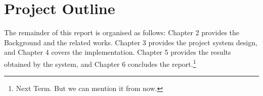\section{Project Outline}
The remainder of this report is organised as follows: Chapter 2 provides the Background and the related works. Chapter 3 provides the project system design, and Chapter 4 covers the implementation. Chapter 5 provides the results obtained by the system, and Chapter 6 concludes the report.\footnote{Next Term. But we can mention it from now.}
